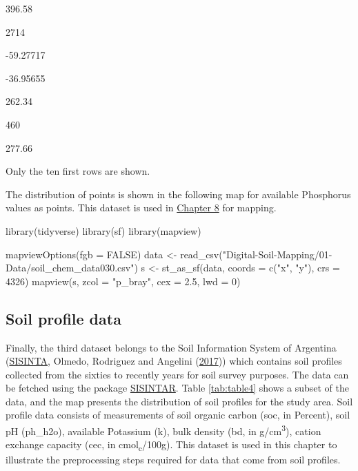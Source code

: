 \documentclass[
  10pt,
  b5paper,
  oneside]{book}
\newenvironment{Shaded}{\begin{snugshade}}{\end{snugshade}}
\newcommand{\AttributeTok}[1]{\textcolor[rgb]{0.77,0.63,0.00}{#1}}
\newcommand{\ConstantTok}[1]{\textcolor[rgb]{0.00,0.00,0.00}{#1}}
\newcommand{\DecValTok}[1]{\textcolor[rgb]{0.00,0.00,0.81}{#1}}
\newcommand{\FloatTok}[1]{\textcolor[rgb]{0.00,0.00,0.81}{#1}}
\newcommand{\FunctionTok}[1]{\textcolor[rgb]{0.00,0.00,0.00}{#1}}
\newcommand{\NormalTok}[1]{#1}
\newcommand{\OtherTok}[1]{\textcolor[rgb]{0.56,0.35,0.01}{#1}}
\newcommand{\StringTok}[1]{\textcolor[rgb]{0.31,0.60,0.02}{#1}}
\begin{document}
396.58

2714

-59.27717

-36.95655

262.34

460

277.66

Only the ten first rows are shown.

The distribution of points is shown in the following map for available Phosphorus values as points. This dataset is used in \href{https://fao-gsp.github.io/GSNmap-TM/step-3-mapping-continuous-soil-properties.html}{Chapter 8} for mapping.

\begin{Shaded}
\begin{Highlighting}[]
\FunctionTok{library}\NormalTok{(tidyverse)}
\FunctionTok{library}\NormalTok{(sf)}
\FunctionTok{library}\NormalTok{(mapview)}

\FunctionTok{mapviewOptions}\NormalTok{(}\AttributeTok{fgb =} \ConstantTok{FALSE}\NormalTok{)}
\NormalTok{data }\OtherTok{\textless{}{-}} \FunctionTok{read\_csv}\NormalTok{(}\StringTok{"Digital{-}Soil{-}Mapping/01{-}Data/soil\_chem\_data030.csv"}\NormalTok{)}
\NormalTok{s }\OtherTok{\textless{}{-}} \FunctionTok{st\_as\_sf}\NormalTok{(data, }\AttributeTok{coords =} \FunctionTok{c}\NormalTok{(}\StringTok{"x"}\NormalTok{, }\StringTok{"y"}\NormalTok{), }\AttributeTok{crs =} \DecValTok{4326}\NormalTok{)}
\FunctionTok{mapview}\NormalTok{(s, }\AttributeTok{zcol =} \StringTok{"p\_bray"}\NormalTok{, }\AttributeTok{cex =} \FloatTok{2.5}\NormalTok{, }\AttributeTok{lwd =} \DecValTok{0}\NormalTok{)}
\end{Highlighting}
\end{Shaded}

\hypertarget{soil-profile-data}{%
\subsection{Soil profile data}\label{soil-profile-data}}

Finally, the third dataset belongs to the Soil Information System of Argentina (\href{http://sisinta.inta.gob.ar/}{SISINTA}, Olmedo, Rodriguez and Angelini (\protect\hyperlink{ref-Olmedo2017}{2017})) which contains soil profiles collected from the sixties to recently years for soil survey purposes. The data can be fetched using the package \href{https://github.com/INTA-Suelos/SISINTAR\#readme}{SISINTAR}. Table \ref{tab:table4} shows a subset of the data, and the map presents the distribution of soil profiles for the study area. Soil profile data consists of measurements of soil organic carbon (soc, in Percent), soil pH (ph\_h2o), available Potassium (k), bulk density (bd, in g/cm\textsuperscript{3}), cation exchange capacity (cec, in cmol\textsubscript{c}/100g). This dataset is used in this chapter to illustrate the preprocessing steps required for data that come from soil profiles.
\end{document}
